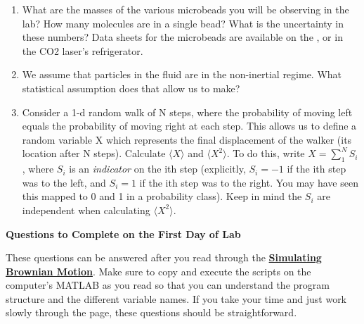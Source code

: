 \documentclass{../signatures}
\begin{document}
\maketitle

\names

\prelab

\begin{enumerate}

    \item What are the masses of the various microbeads you will be observing in the lab? How many molecules are in a single bead? What is the uncertainty in these numbers? Data sheets for the microbeads are available on the \ExpReprints, or in the CO2 laser's refrigerator.
    
    \item We assume that particles in the fluid are in the non-inertial regime. What statistical assumption does that allow us to make? 

    \item Consider a 1-d random walk of N steps, where the probability of moving left equals the probability of moving right at each step. This allows us to define a random variable X  which represents the final displacement of the walker (its location after N steps). Calculate $\langle X \rangle$ and $\langle X^2\rangle$. To do this, write $X=\sum_{1}^{N} S_i $, where $S_i$ is an \emph{indicator} on the ith step (explicitly, $S_i=-1$ if the ith step was to the left, and $S_i=1$ if the ith step was to the right. You may have seen this mapped to 0 and 1 in a probability class). Keep in mind the $S_i$ are independent when calculating $\langle X^2\rangle$. 
       \\[36pt]
\end{enumerate}

\prelabsignatures

\textbf{Questions to Complete on the First Day of Lab}

These questions can be answered after you read through the \href{http://experimentationlab.berkeley.edu/node/83}{\textbf{Simulating Brownian Motion}}. Make sure to copy and execute the scripts on the computer's MATLAB as you read so that you can understand the program structure and the different variable names. If you take your time and just work slowly through the page, these questions should be straightforward. 
\end{document}
